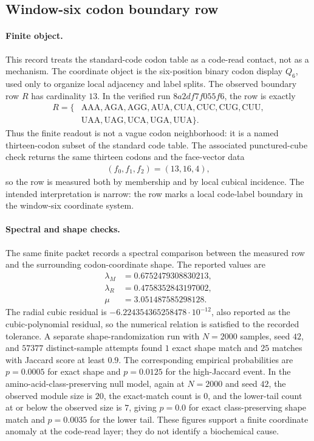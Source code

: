
\subsection{Window-six codon boundary row}
\label{sec:bioreality-h0-r-cardinality-13}

\paragraph{Finite object.}
This record treats the standard-code codon table as a code-read contact, not as a mechanism.  The coordinate object is the six-position binary codon display $Q_6$, used only to organize local adjacency and label splits.  The observed boundary row $R$ has cardinality $13$.  In the verified run $8a2df7f055f6$, the row is exactly
$$
\begin{aligned}
R=\{&\mathrm{AAA},\mathrm{AGA},\mathrm{AGG},\mathrm{AUA},\mathrm{CUA},\mathrm{CUC},\mathrm{CUG},\mathrm{CUU},\\
&\mathrm{UAA},\mathrm{UAG},\mathrm{UCA},\mathrm{UGA},\mathrm{UUA}\}.
\end{aligned}
$$
Thus the finite readout is not a vague codon neighborhood: it is a named thirteen-codon subset of the standard code table.  The associated punctured-cube check returns the same thirteen codons and the face-vector data
$$
\begin{aligned}
(f_0,f_1,f_2)=(13,16,4),
\end{aligned}
$$
so the row is measured both by membership and by local cubical incidence.  The intended interpretation is narrow: the row marks a local code-label boundary in the window-six coordinate system.

\paragraph{Spectral and shape checks.}
The same finite packet records a spectral comparison between the measured row and the surrounding codon-coordinate shape.  The reported values are
$$
\begin{aligned}
\lambda_M&=0.6752479308830213,\\
\lambda_R&=0.4758352843197002,\\
\mu&=3.051487585298128.
\end{aligned}
$$
The radial cubic residual is $-6.224354365258478\cdot 10^{-12}$, also reported as the cubic-polynomial residual, so the numerical relation is satisfied to the recorded tolerance.  A separate shape-randomization run with $N=2000$ samples, seed $42$, and $57377$ distinct-sample attempts found $1$ exact shape match and $25$ matches with Jaccard score at least $0.9$.  The corresponding empirical probabilities are $p=0.0005$ for exact shape and $p=0.0125$ for the high-Jaccard event.  In the amino-acid-class-preserving null model, again at $N=2000$ and seed $42$, the observed module size is $20$, the exact-match count is $0$, and the lower-tail count at or below the observed size is $7$, giving $p=0.0$ for exact class-preserving shape match and $p=0.0035$ for the lower tail.  These figures support a finite coordinate anomaly at the code-read layer; they do not identify a biochemical cause.

